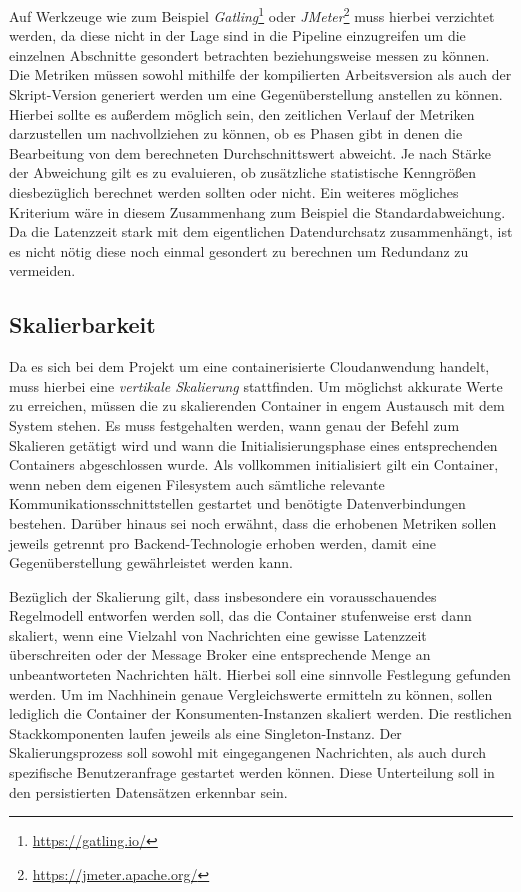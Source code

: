 Auf Werkzeuge wie zum Beispiel \emph{Gatling}\footnote{\url{https://gatling.io/}} oder \emph{JMeter}\footnote{\url{https://jmeter.apache.org/}} muss hierbei verzichtet werden, da diese nicht in der Lage sind in die Pipeline einzugreifen um die einzelnen Abschnitte gesondert betrachten beziehungsweise messen zu können. Die Metriken müssen sowohl mithilfe der kompilierten Arbeitsversion als auch der Skript-Version generiert werden um eine Gegenüberstellung anstellen zu können. Hierbei sollte es außerdem möglich sein, den zeitlichen Verlauf der Metriken darzustellen um nachvollziehen zu können, ob es Phasen gibt in denen die Bearbeitung von dem berechneten Durchschnittswert abweicht. Je nach Stärke der Abweichung gilt es zu evaluieren, ob zusätzliche statistische Kenngrößen diesbezüglich berechnet werden sollten oder nicht. Ein weiteres mögliches Kriterium wäre in diesem Zusammenhang zum Beispiel die Standardabweichung. Da die Latenzzeit stark mit dem eigentlichen Datendurchsatz zusammenhängt, ist es nicht nötig diese noch einmal gesondert zu berechnen um Redundanz zu vermeiden.


\subsection{Skalierbarkeit \checkmark}
Da es sich bei dem Projekt um eine containerisierte Cloudanwendung handelt, muss hierbei eine \emph{vertikale Skalierung} stattfinden. Um möglichst akkurate Werte zu erreichen, müssen die zu skalierenden Container in engem Austausch mit dem System stehen. Es muss festgehalten werden, wann genau der Befehl zum Skalieren getätigt wird und wann die Initialisierungsphase eines entsprechenden Containers abgeschlossen wurde. Als vollkommen initialisiert gilt ein Container, wenn neben dem eigenen Filesystem auch sämtliche relevante Kommunikationsschnittstellen gestartet und benötigte Datenverbindungen bestehen. Darüber hinaus sei noch erwähnt, dass die erhobenen Metriken sollen jeweils getrennt pro Backend-Technologie erhoben werden, damit eine Gegenüberstellung gewährleistet werden kann.

Bezüglich der Skalierung gilt, dass insbesondere ein vorausschauendes Regelmodell entworfen werden soll, das die Container stufenweise erst dann skaliert, wenn eine Vielzahl von Nachrichten eine gewisse Latenzzeit überschreiten oder der Message Broker eine entsprechende Menge an unbeantworteten Nachrichten hält. Hierbei soll eine sinnvolle Festlegung gefunden werden. Um im Nachhinein genaue Vergleichswerte ermitteln zu können, sollen lediglich die Container der Konsumenten-Instanzen skaliert werden. Die restlichen Stackkomponenten laufen jeweils als eine Singleton-Instanz. Der Skalierungsprozess soll sowohl mit eingegangenen Nachrichten, als auch durch spezifische Benutzeranfrage gestartet werden können. Diese Unterteilung soll in den persistierten Datensätzen erkennbar sein.

